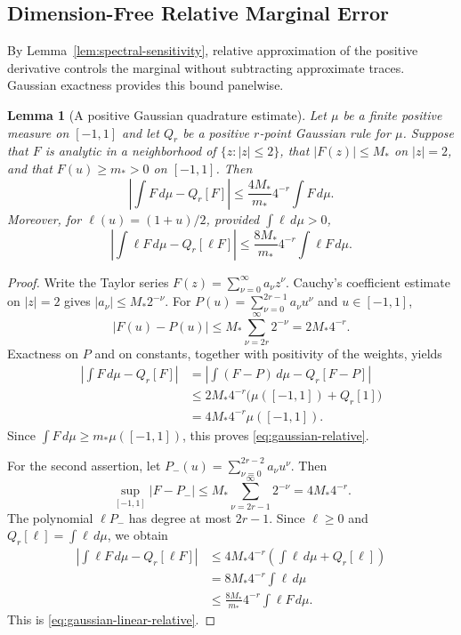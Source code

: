 \documentclass[conference]{IEEEtran}
\newtheorem{lemma}{Lemma}
\theoremstyle{definition}
\begin{document}
\subsection{Dimension-Free Relative Marginal Error}
By Lemma~\ref{lem:spectral-sensitivity}, relative approximation
of the positive derivative controls the marginal without subtracting
approximate traces. Gaussian exactness provides this bound panelwise.

\begin{lemma}[A positive Gaussian quadrature estimate]
\label{lem:gaussian-relative}
Let $\mu$ be a finite positive measure on $[-1,1]$ and let $Q_r$ be a positive $r$-point Gaussian rule for $\mu$. Suppose that $F$ is analytic in a neighborhood of $\{z:|z|\le2\}$, that $|F(z)|\le {M_*}$ on $|z|=2$, and that $F(u)\ge {m_*}>0$ on $[-1,1]$. Then
\begin{equation}
\left|\int F\,d\mu-Q_r[F]\right|
\le\frac{4{M_*}}{{m_*}}4^{-r}\int F\,d\mu.
\label{eq:gaussian-relative}
\end{equation}
Moreover, for $\ell(u)=(1+u)/2$, provided $\int\ell\,d\mu>0$,
\begin{equation}
\left|\int\ell F\,d\mu-Q_r[\ell F]\right|
\le\frac{8{M_*}}{{m_*}}4^{-r}\int\ell F\,d\mu.
\label{eq:gaussian-linear-relative}
\end{equation}
\end{lemma}
\begin{proof}
Write the Taylor series $F(z)=\sum_{\nu=0}^\infty a_\nu z^\nu$. Cauchy's coefficient estimate on $|z|=2$ gives $|a_\nu|\le {M_*}2^{-\nu}$. For $P(u)=\sum_{\nu=0}^{2r-1}a_\nu u^\nu$ and $u\in[-1,1]$,
\[
|F(u)-P(u)|\le {M_*}\sum_{\nu=2r}^\infty2^{-\nu}
=2{M_*}4^{-r}.
\]
Exactness on $P$ and on constants, together with positivity of the weights, yields
\begin{align*}
\left|\int F\,d\mu-Q_r[F]\right|
&=\left|\int(F-P)\,d\mu-Q_r[F-P]\right|\\
&\le2{M_*}4^{-r}\bigl(\mu([-1,1])+Q_r[1]\bigr)\\
&=4{M_*}4^{-r}\mu([-1,1]).
\end{align*}
Since $\int F\,d\mu\ge {m_*}\mu([-1,1])$, this proves \eqref{eq:gaussian-relative}.

For the second assertion, let $P_-(u)=\sum_{\nu=0}^{2r-2}a_\nu u^\nu$. Then
\[
\sup_{[-1,1]}|F-P_-|
\le {M_*}\sum_{\nu=2r-1}^\infty2^{-\nu}=4{M_*}4^{-r}.
\]
The polynomial $\ell P_-$ has degree at most $2r-1$. Since $\ell\ge0$ and $Q_r[\ell]=\int\ell\,d\mu$, we obtain
\begin{align*}
\left|\int\ell F\,d\mu-Q_r[\ell F]\right|
&\le4{M_*}4^{-r}\left(\int\ell\,d\mu+Q_r[\ell]\right)\\
&=8{M_*}4^{-r}\int\ell\,d\mu\\
&\le\frac{8{M_*}}{{m_*}}4^{-r}\int\ell F\,d\mu.
\end{align*}
This is \eqref{eq:gaussian-linear-relative}.
\end{proof}
\end{document}
